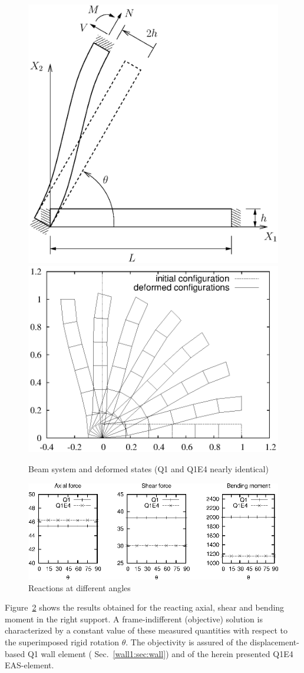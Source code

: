 \begin{figure}[H]
  \begin{center}
    \includegraphics[width=0.4\linewidth]{eps/rot-beam-system}
    \hspace{0ex}
    \includegraphics[width=0.55\linewidth]{eps/rot-beam-displacements}
  \end{center}
  \caption{Beam system and deformed states (Q1 and Q1E4 nearly identical)}
  \label{wall1:fig:rot-beam-system-displacement}
\end{figure}

\begin{figure}[H]
  \begin{center}
    \includegraphics[width=0.8\linewidth]{eps/rot-stress-resultant_b}
  \end{center}
  \caption{Reactions at different angles}
  \label{wall1:fig:rot-stress-resultant}
\end{figure}

Figure~\ref{wall1:fig:rot-stress-resultant} shows the results obtained for the reacting axial, shear and
bending moment in the right support. A frame-indifferent (objective) solution
is characterized by a constant value of these measured quantities with respect
to the superimposed rigid rotation $\theta$. The objectivity is assured of the 
displacement-based Q1 wall element (\cf{} Sec.~\ref{wall1:sec:wall}) and of the
herein presented Q1E4 EAS-element.


